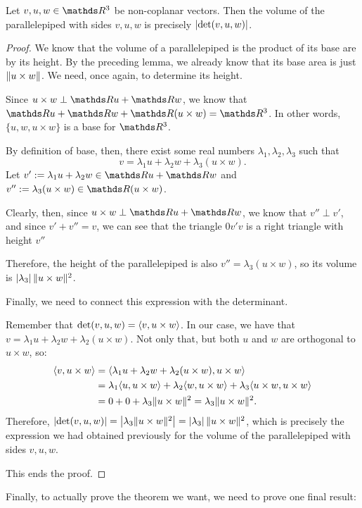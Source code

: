 \begin{theorem}
	Let $v,u,w\in \R^3$ be non-coplanar vectors. Then the volume of the parallelepiped with sides $v,u,w$ is precisely $\left\vert\det(v,u,w)\right\vert$.
\end{theorem}
\begin{proof}
	We know that the volume of a parallelepiped is the product of its base are by its height. By the preceding lemma, we already know that its base area is just $\lVert u\times w\rVert$. We need, once again, to determine its height.
	
	Since $u\times w\perp \R u+\R w$, we know that $\R u+\R w+\R(u\times w)=\R^3$. In other words, $\{u,w,u\times w\}$ is a base for $\R^3$.
	
	By definition of base, then, there exist some real numbers $\lambda_1,\lambda_2,\lambda_3$ such that $$v=\lambda_1u+\lambda_2w+\lambda_3(u\times w).$$Let $v':=\lambda_1u+\lambda_2w\in \R u+\R w$ and $v'':=\lambda_3(u\times w)\in \R(u\times w)$.
	
	Clearly, then, since $u\times w\perp \R u+\R w$, we know that $v''\perp v'$, and since $v'+v''=v$, we can see that the triangle $0v'v$ is a right triangle with height $v''$
	
	Therefore, the height of the parallelepiped is also $v''=\lambda_3(u\times w)$, so its volume is $\left\vert\lambda_3\right\vert\lVert u\times w\rVert^2$.
	
	Finally, we need to connect this expression with the determinant. 
	
	Remember that $\det(v,u,w)=\langle v,u\times w\rangle$. In our case, we have that $v=\lambda_1u+\lambda_2w+\lambda_2(u\times w)$. Not only that, but both $u$ and $w$ are orthogonal to $u\times w$, so:
	\begin{align*}
		\langle v,u\times w\rangle&=\langle \lambda_1u+\lambda_2w+\lambda_2(u\times w),u\times w\rangle\\
		&=\lambda_1\langle u,u\times w\rangle+\lambda_2\langle w,u\times w\rangle+\lambda_3\langle u\times w,u\times w\rangle\\
		&=0+0+\lambda_3\lVert u\times w\rVert^2=\lambda_3\lVert u\times w\rVert^2.
	\end{align*}Therefore, $\left\vert\det(v,u,w)\right\vert=\left\vert\lambda_3\lVert u\times w\rVert^2\right\vert=\left\vert\lambda_3\right\vert\lVert u\times w\rVert^2$, which is precisely the expression we had obtained previously for the volume of the parallelepiped with sides $v,u,w$.
	
	This ends the proof.	
\end{proof}

Finally, to actually prove the theorem we want, we need to prove one final result:

